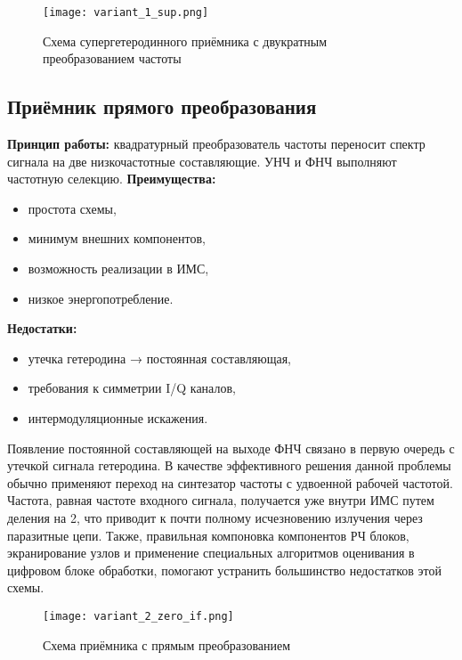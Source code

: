 \documentclass[a4paper,12pt]{article}
\begin{document}
\begin{figure}[H]
    \centering
    \texttt{[image: variant\_1\_sup.png]}
    \caption{Схема супергетеродинного приёмника с двукратным преобразованием частоты}
    \label{fig:enter-label}
\end{figure}

\subsection{Приёмник прямого преобразования}
\textbf{Принцип работы:} \newline
квадратурный преобразователь частоты переносит спектр сигнала на две низкочастотные составляющие. УНЧ и ФНЧ выполняют частотную селекцию.   
\newline
\newline
\textbf{Преимущества:}
\begin{itemize}
    \item простота схемы,
    \item минимум внешних компонентов,
    \item возможность реализации в ИМС,
    \item низкое энергопотребление.
\end{itemize}
\textbf{Недостатки:}
\begin{itemize}
    \item утечка гетеродина → постоянная составляющая,
    \item требования к симметрии I/Q каналов,
    \item интермодуляционные искажения.
\end{itemize}
Появление постоянной составляющей на выходе ФНЧ связано в первую очередь с утечкой сигнала гетеродина. В качестве эффективного решения данной проблемы обычно применяют переход на синтезатор частоты с удвоенной рабочей частотой. Частота, равная частоте входного сигнала, получается уже внутри ИМС путем деления на 2, что приводит к почти полному исчезновению излучения через паразитные цепи. Также, правильная компоновка компонентов РЧ блоков, экранирование узлов и применение специальных алгоритмов оценивания в цифровом блоке обработки, помогают устранить большинство недостатков этой схемы.

\begin{figure}[H]
    \centering
    \texttt{[image: variant\_2\_zero\_if.png]}
    \caption{Схема приёмника с прямым преобразованием}
    \label{fig:enter-label}
\end{figure}
\end{document}
